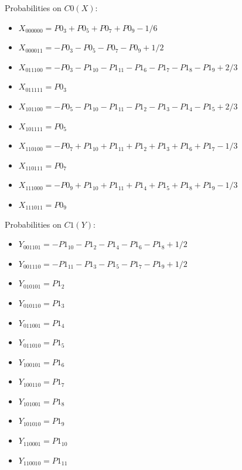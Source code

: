 \documentclass[11pt]{article}
\begin{document}
Probabilities on $C0 (X)$:
\begin{itemize}
    \item $X_{000000} = P0_3 + P0_5 + P0_7 + P0_9 - 1/6$
    \item $X_{000011} = -P0_3 - P0_5 - P0_7 - P0_9 + 1/2$
    \item $X_{011100} = -P0_3 - P1_{10} - P1_{11} - P1_6 - P1_7 - P1_8 - P1_9 + 2/3$
    \item $X_{011111} = P0_3$
    \item $X_{101100} = -P0_5 - P1_{10} - P1_{11} - P1_2 - P1_3 - P1_4 - P1_5 + 2/3$
    \item $X_{101111} = P0_5$
    \item $X_{110100} = -P0_7 + P1_{10} + P1_{11} + P1_2 + P1_3 + P1_6 + P1_7 - 1/3$
    \item $X_{110111} = P0_7$
    \item $X_{111000} = -P0_9 + P1_{10} + P1_{11} + P1_4 + P1_5 + P1_8 + P1_9 - 1/3$
    \item $X_{111011} = P0_9$
\end{itemize}

Probabilities on $C1 (Y)$:
\begin{itemize}
    \item $Y_{001101} = -P1_{10} - P1_2 - P1_4 - P1_6 - P1_8 + 1/2$
    \item $Y_{001110} = -P1_{11} - P1_3 - P1_5 - P1_7 - P1_9 + 1/2$
    \item $Y_{010101} = P1_2$
    \item $Y_{010110} = P1_3$
    \item $Y_{011001} = P1_4$
    \item $Y_{011010} = P1_5$
    \item $Y_{100101} = P1_6$
    \item $Y_{100110} = P1_7$
    \item $Y_{101001} = P1_8$
    \item $Y_{101010} = P1_9$
    \item $Y_{110001} = P1_{10}$
    \item $Y_{110010} = P1_{11}$
\end{itemize}
\end{document}
